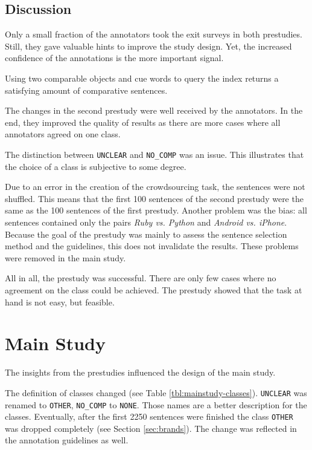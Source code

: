 \subsection{Discussion}
Only a small fraction of the annotators took the exit surveys in both prestudies. Still, they gave valuable hints to improve the study design. Yet, the increased confidence of the annotations is the more important signal.

Using two comparable objects and cue words to query the index returns a satisfying amount of comparative sentences.

The changes in the second prestudy were well received by the annotators. In the end, they improved the quality of results as there are more cases where all annotators agreed on one class.


The distinction between \texttt{UNCLEAR} and \texttt{NO\_COMP} was an issue. This illustrates that the choice of a class is subjective to some degree. 

Due to an error in the creation of the crowdsourcing task, the sentences were not shuffled. This means that the first 100 sentences of the second prestudy were the same as the 100 sentences of the first prestudy. Another problem was the bias: all sentences contained only the pairs \emph{Ruby vs. Python} and \emph{Android vs. iPhone}. Because the goal of the prestudy was mainly to assess the sentence selection method and the guidelines, this does not invalidate the results. These problems were removed in the main study.

All in all, the prestudy was successful. There are only few cases where no agreement on the class could be achieved. The prestudy showed that the task at hand is not easy, but feasible.

\newpage
\section{Main Study}
\label{sec:mainstudy}
\label{sec:designchanges}
The insights from the prestudies influenced the design of the main study.

The definition of classes changed (see Table \ref{tbl:mainstudy-classes}). \texttt{UNCLEAR} was renamed to \texttt{OTHER}, \texttt{NO\_COMP} to \texttt{NONE}. Those names are a better description for the classes. Eventually, after the first 2250 sentences were finished the class \texttt{OTHER} was dropped completely (see Section \ref{sec:brands}). The change was reflected in the annotation guidelines as well. 

